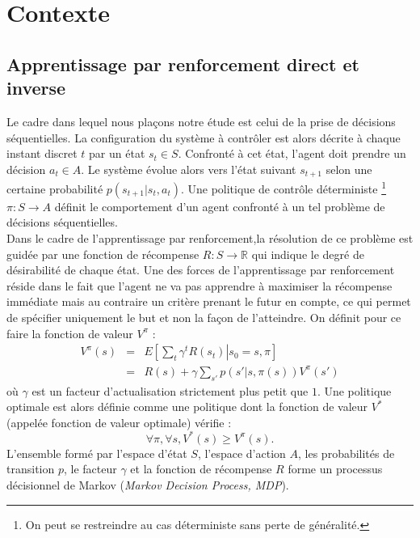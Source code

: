 \documentclass[publibook-draft]{CAp2012}
\begin{document}
\section{Contexte}
\label{back.sec}
\subsection{Apprentissage par renforcement direct et inverse}
Le cadre dans lequel nous plaçons notre étude est celui de la prise de décisions séquentielles. La configuration du système à contrôler est alors décrite à chaque instant discret $t$ par un état $s_t \in S$. Confronté à cet état, l'agent doit prendre un décision $a_t\in A$. Le système évolue alors vers l'état suivant $s_{t+1}$ selon une certaine probabilité $p(s_{t+1}|s_t, a_t)$. Une politique de contrôle déterministe \footnote{On peut se restreindre au cas déterministe sans perte de généralité.} $\pi : S\rightarrow A$ définit le comportement d'un agent confronté à un tel problème de décisions séquentielles.\\

Dans le cadre de l'apprentissage par renforcement,la résolution de ce problème est guidée par une fonction de récompense $R : S \rightarrow \mathbb{R}$ qui indique le degré de désirabilité de chaque état. Une des forces de l'apprentissage par renforcement réside dans le fait que l'agent ne va pas apprendre à maximiser la récompense immédiate mais au contraire un critère prenant le futur en compte, ce qui permet de spécifier uniquement le but et non la façon de l'atteindre. On définit pour ce faire la fonction de valeur $V^\pi$ :
\begin{eqnarray}
\label{Vdef.eqn}
V^\pi(s) &=& E\left[\left.\sum_t\gamma^tR(s_t)\right|s_0=s,\pi\right]\\
&=& R(s) + \gamma\sum_{s'}p(s'|s,\pi(s))V^\pi(s')
\label{BellmanV.eqn}
\end{eqnarray}
où $\gamma$ est un facteur d'actualisation strictement plus petit que $1$. Une politique optimale est alors définie comme une politique dont la fonction de valeur $V^*$ (appelée fonction de valeur optimale) vérifie :
\begin{equation}
\forall \pi, \forall s, V^*(s) \geq V^\pi(s).
\end{equation}
L'ensemble formé par l'espace d'état $S$, l'espace d'action $A$, les probabilités de transition $p$, le facteur $\gamma$ et la fonction de récompense $R$ forme un processus décisionnel de Markov ({\it Markov Decision Process, MDP}).\\
\end{document}
